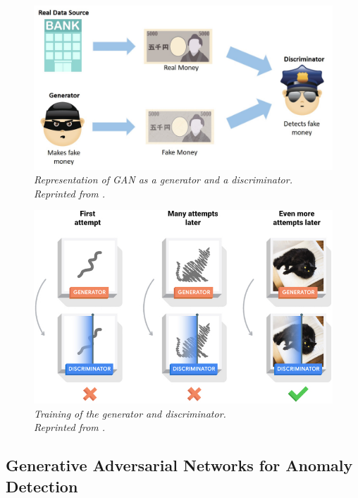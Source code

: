 \begin{figure}[H]
  \centering
  \caption[Representation of GAN as a generator and a discriminator.]{\emph{Representation of GAN as a generator and a discriminator. \\
  Reprinted from \citeauthor{ai_research_innovationhub_2020} \citeyear{ai_research_innovationhub_2020}.}}\label{fig:GAN}
  \includegraphics[scale = 0.3]{figures/GANs.jpg}  
\end{figure}

\begin{figure}[H]
  \centering
  \caption[Training of the generator and discriminator.]{\emph{Training of the generator and discriminator. \\
  Reprinted from \citeauthor{tensorflow_2021} \citeyear{tensorflow_2021}.}}\label{fig:GAN_training}
  \includegraphics[scale = 0.5]{figures/GAN_2.jpg}  
\end{figure}

\subsection{Generative Adversarial Networks for Anomaly Detection}
